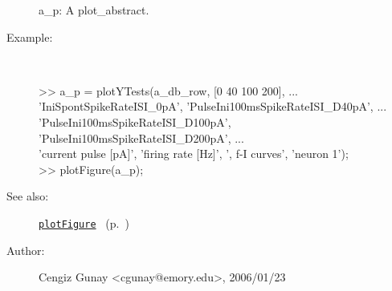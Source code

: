 \begin{description}
   a\_p: A plot\_abstract.
%
\item[Example:]~
\begin{lyxcode} >> a\_p = plotYTests(a\_db\_row, [0 40 100 200], ...
\\%
                      {'IniSpontSpikeRateISI\_0pA', 'PulseIni100msSpikeRateISI\_D40pA', ...
\\%
                       'PulseIni100msSpikeRateISI\_D100pA', 'PulseIni100msSpikeRateISI\_D200pA'}, ...
\\%
                      {'current pulse [pA]', 'firing rate [Hz]'}, ', f-I curves', 'neuron 1');
\\%
 >> plotFigure(a\_p);
\\%
\end{lyxcode}
%
\item[See also:]%
\hyperlink{ref_plotFigure}{\texttt{plotFigure}}%
\ (p.~\pageref{ref_plotFigure})%
%
%
\item[Author:]%
Cengiz Gunay <cgunay@emory.edu>, 2006/01/23
%
\end{description}
\methodline%
